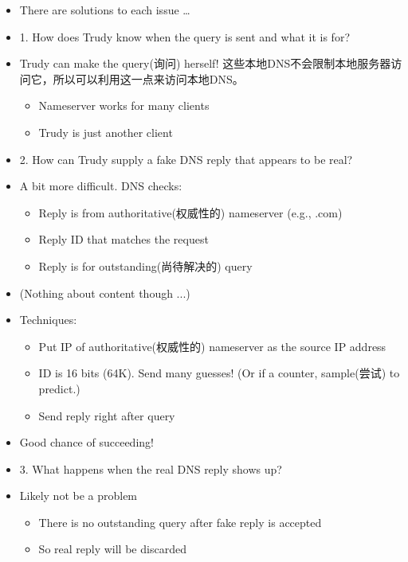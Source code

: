 \documentclass[12pt]{ctexart}   %
\begin{document}
\begin{itemize}
		\item There are solutions to each issue \dots
		
		\item {\color{blue} 1.} How does Trudy know when the query is sent and what it is for?
		\item Trudy can make the query(询问) herself! 这些本地DNS不会限制本地服务器访问它，所以可以利用这一点来访问本地DNS。
		\begin{itemize}
			\item Nameserver works for many clients
			\item Trudy is just another client
		\end{itemize}

		\item {\color{blue} 2.} How can Trudy supply a fake DNS reply that appears to be real?
		\item A bit more difficult. DNS checks:
		\begin{itemize}
			\item Reply is from authoritative(权威性的) nameserver (e.g., .com)
			\item Reply ID that matches the request
			\item Reply is for outstanding(尚待解决的) query
		\end{itemize}
		\item (Nothing about content though ...)
		\item Techniques:
		\begin{itemize}
			\item Put IP of authoritative(权威性的) nameserver as the source IP address
			\item ID is 16 bits (64K). Send many guesses! (Or if a counter, sample(尝试) to predict.)
			\item Send reply right after query
		\end{itemize}
		\item Good chance of succeeding!
		
		\item {\color{blue} 3.} What happens when the real DNS reply shows up?
		\item Likely not be a problem
		\begin{itemize}
			\item There is no outstanding query after fake reply is accepted
			\item So real reply will be discarded
		\end{itemize}
	\end{itemize}
\end{document}
